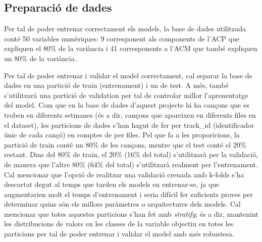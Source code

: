 \subsection{Preparació de dades}
Per tal de poder entrenar correctament els models, la base de dades utilitzada conté 50 variables numèriques: 9 corresponent als components de l'ACP que expliquen el 80\% de la variància i 41 corresponents a l'ACM que també expliquen un 80\% de la variància.

Per tal de poder entrenar i validar el model correctament, cal separar la base de dades en una partició de train (entrenament) i un de test. A més, també s'utilitzarà una partició de validation per tal de controlar millor l'aprenentatge del model. Com que en la base de dades d'aquest projecte hi ha cançons que es troben en diferents setmanes (és a dir, cançons que apareixen en diferents files en el dataset), les particions de dades s'han hagut de fer per track\_id (identificador únic de cada cançó) en comptes de per files. Pel que fa a les proporicions, la partició de train conté un 80\% de les cançons, mentre que el test conté el 20\% restant. Dins del 80\% de train, el 20\% (16\% del total) s'utilitzarà per la validació, de manera que l'altre 80\% (64\% del total) s'utilitzarà realment per l'entrenament. Cal mencionar que l'opció de realitzar una validació creuada amb k-folds s'ha descartat degut al temps que tarden els models en entrenar-se, ja que augmentarien molt el temps d'entrenament i seria difícil fer suficients proves per determinar quins són els millors paràmetres o arquitectures dels models. Cal mencionar que totes aquestes particions s'han fet amb \textit{stratify}; és a dir, mantenint les distribucions de valors en les classes de la variable objectiu en totes les particions per tal de poder entrenar i validar el model amb més robustesa.

